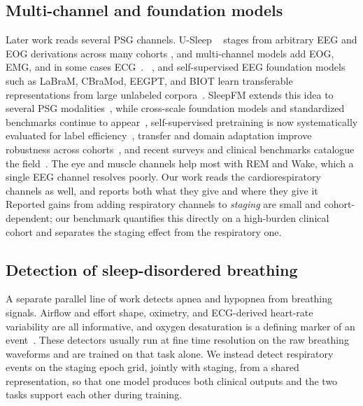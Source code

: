 \documentclass[preprint,12pt]{elsarticle}
\providecommand{\DIFaddtex}[1]{{\protect\color{blue} \sf #1}} %
\providecommand{\DIFdeltex}[1]{{\protect\color{red} \scriptsize #1}} %
\providecommand{\DIFaddbegin}{} %
\providecommand{\DIFaddend}{} %
\providecommand{\DIFdelbegin}{} %
\providecommand{\DIFdelend}{} %
\providecommand{\DIFadd}[1]{\texorpdfstring{\DIFaddtex{#1}}{#1}} %
\providecommand{\DIFdel}[1]{\texorpdfstring{\DIFdeltex{#1}}{}} %
\providecommand{\DIFscaledelfig}{0.5}
\newlength{\DIFdelgraphicswidth} %
\newlength{\DIFdelgraphicsheight} %
\providecommand{\DIFaddincludegraphics}[2][]{{\color{blue}\fbox{\DIFOincludegraphics[#1]{#2}}}} %
\providecommand{\DIFdelincludegraphics}[2][]{%
\sbox{\DIFdelgraphicsbox}{\DIFOincludegraphics[#1]{#2}}%
\settoboxwidth{\DIFdelgraphicswidth}{\DIFdelgraphicsbox} %
\settoboxtotalheight{\DIFdelgraphicsheight}{\DIFdelgraphicsbox} %
\scalebox{\DIFscaledelfig}{%
\parbox[b]{\DIFdelgraphicswidth}{\usebox{\DIFdelgraphicsbox}\\[-\baselineskip] \rule{\DIFdelgraphicswidth}{0em}}\llap{\resizebox{\DIFdelgraphicswidth}{\DIFdelgraphicsheight}{%
\setlength{\unitlength}{\DIFdelgraphicswidth}%
\begin{picture}(1,1)%
\thicklines\linethickness{2pt} %
{\color[rgb]{1,0,0}\put(0,0){\framebox(1,1){}}}%
{\color[rgb]{1,0,0}\put(0,0){\line( 1,1){1}}}%
{\color[rgb]{1,0,0}\put(0,1){\line(1,-1){1}}}%
\end{picture}%
}\hspace*{3pt}}} %
} %
\DeclareRobustCommand{\DIFaddbegin}{\DIFOaddbegin \let\includegraphics\DIFaddincludegraphics} %
\DeclareRobustCommand{\DIFaddend}{\DIFOaddend \let\includegraphics\DIFOincludegraphics} %
\DeclareRobustCommand{\DIFdelbegin}{\DIFOdelbegin \let\includegraphics\DIFdelincludegraphics} %
\DeclareRobustCommand{\DIFdelend}{\DIFOaddend \let\includegraphics\DIFOincludegraphics} %
\begin{document}
\subsection{\DIFadd{Multi-channel and foundation models}}
\DIFadd{Later work reads }\DIFaddend several PSG channels. U-Sleep \DIFdelbegin \DIFdel{~\cite{perslev2021usleep} }\DIFdelend stages from arbitrary EEG and EOG derivations
across many cohorts\DIFdelbegin \DIFdel{, and multi-channel models add EOG, EMG, and in some cases
ECG~\cite{phan2021xsleepnet,biot2023,sleepfm2026}. }\DIFdelend \DIFaddbegin \DIFadd{~\cite{perslev2021usleep}, and self-supervised EEG foundation models such
as LaBraM, CBraMod, EEGPT, and BIOT learn transferable representations from large unlabeled
corpora~\cite{labram2024,cbramod2025,eegpt2024,biot2023}. SleepFM extends this idea to several
PSG modalities~\cite{sleepfm2026}, while cross-scale foundation models and standardized
benchmarks continue to appear~\cite{csbrain2025,neuroatlas2026,sleepyland2026}, self-supervised
pretraining is now systematically evaluated for label efficiency~\cite{estevan2025ssl}, transfer
and domain adaptation improve robustness across cohorts~\cite{guillot2023transfer}, and recent
surveys and clinical benchmarks catalogue the field~\cite{yang2026review,hanif2025insomnia}. }\DIFaddend The eye and muscle channels help most with REM and Wake,
which a single EEG channel resolves poorly. \DIFdelbegin \DIFdel{Our work reads the
cardiorespiratory channels as well, and reports both what they give and where they give it}\DIFdelend \DIFaddbegin \DIFadd{Reported gains from adding respiratory channels to
\emph{staging} are small and cohort-dependent; our benchmark quantifies this directly on a
high-burden clinical cohort and separates the staging effect from the respiratory one}\DIFaddend .

\subsection{Detection of sleep-disordered breathing}
A \DIFdelbegin \DIFdel{separate }\DIFdelend \DIFaddbegin \DIFadd{parallel }\DIFaddend line of work detects apnea and hypopnea from breathing signals. Airflow and effort
shape, oximetry, and ECG-derived heart-rate variability are all informative, and oxygen
desaturation is a defining marker of an event~\cite{jing2025cpap}. These detectors usually run
at fine time resolution on the raw breathing waveforms and are trained on that task alone. We
\DIFaddbegin \DIFadd{instead }\DIFaddend detect respiratory events on the staging epoch grid, jointly with staging, from a
shared representation, so that one model produces both clinical outputs and the two tasks
support each other during training.
\end{document}
